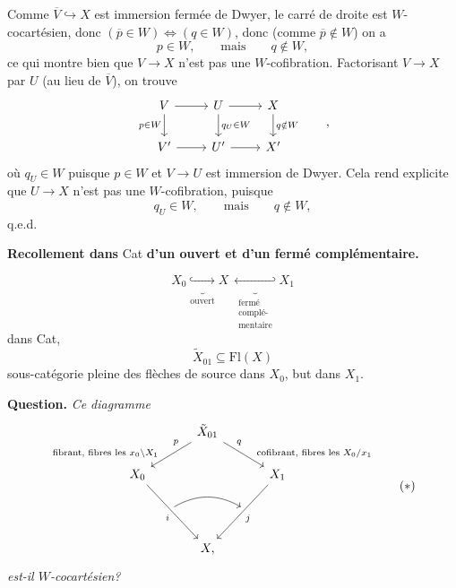 \documentclass[11pt]{article}
\newcommand{\printedpage}[1]{\marginpar{\footnotesize p.~#1}}
\newcommand{\msp}[1]{\marginpar{\footnotesize [#1]}}
\begin{document}
\printedpage{12}
Comme $\overline{V} \hookrightarrow X$ est immersion fermée de Dwyer, le carré de droite est $W$-cocartésien, donc $(\overline{p} \in W) \iff (q \in W)$, donc (comme $\overline{p} \notin W$) on a
\[ p \in W, \qquad \text{mais} \qquad q \notin W, \]
ce qui montre bien que $V \longrightarrow X$ n'est pas une $W$-cofibration. Factorisant $V \longrightarrow X$ par $U$ (au lieu de $\overline{V}$), on trouve
\[
\begin{tikzcd}
V \arrow[r] \arrow[d, "p\in W"'] & U \arrow[r] \arrow[d, "q_U\in W"] & X \arrow[d, "q\notin W"] \\
V' \arrow[r] & U' \arrow[r] & X'
\end{tikzcd}
\qquad ,
\]
où $q_U \in W$ puisque $p \in W$ et $V \longrightarrow U$ est immersion de Dwyer. Cela rend explicite que $U \longrightarrow X$ n'est pas une $W$-cofibration, puisque
\[ q_U \in W, \qquad \text{mais} \qquad q \notin W, \]
\hfill q.e.d.

\msp{page 17}\textbf{Recollement dans} Cat \textbf{d'un ouvert et d'un fermé complémentaire.}


\[ X_0 \underbrace{\hookrightarrow}_{\text{ouvert}} X \ \underbrace{\hookleftarrow}_{\substack{\text{fermé}\\ \text{complé-}\\ \text{mentaire}}} X_1 \]
dans Cat, 
\[ \tilde{X}_{01} \subseteq \mathrm{Fl}(X) \]
 sous-catégorie pleine des flèches de source dans $X_0$, but dans $X_1$.

\textbf{Question.} \textit{Ce diagramme}
\[
\begin{tikzcd}[column sep=small]
 & & \tilde{X}_{01} \arrow[dll, "p"' near start, "\text{fibrant, fibres les $x_0\backslash X_1$}"' near end] \arrow[drr, "q" near start, "\text{cofibrant, fibres les $X_0/x_1$}" near end] & & \\
X_0 \arrow[ddrr, "i"'] & & & & X_1 \arrow[ddll, "j"] \\
 & {} \arrow[rr, bend left] & & {} & \\
 & & X, & &
\end{tikzcd}
\tag*{$(*)$}
\]
\printedpage{13}
\textit{est-il $W$-cocartésien?}
\end{document}
